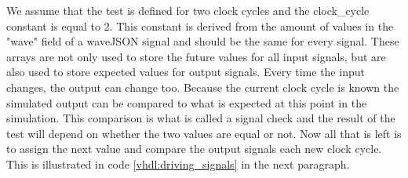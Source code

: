 We assume that the test is defined for two clock cycles and the clock\_cycle constant is equal to 2. This constant is derived from the amount of values in the "wave" field of a waveJSON signal and should be the same for every signal.
\npar
These arrays are not only used to store the future values for all input signals, but are also used to store expected values for output signals. Every time the input changes, the output can change too. Because the current clock cycle is known the simulated output can be compared to what is expected at this point in the simulation. This comparison is what is called a signal check and the result of the test will depend on whether the two values are equal or not.
\npar
Now all that is left is to assign the next value and compare the output signals each new clock cycle. This is illustrated in code \ref{vhdl:driving_signals} in the next paragraph.
